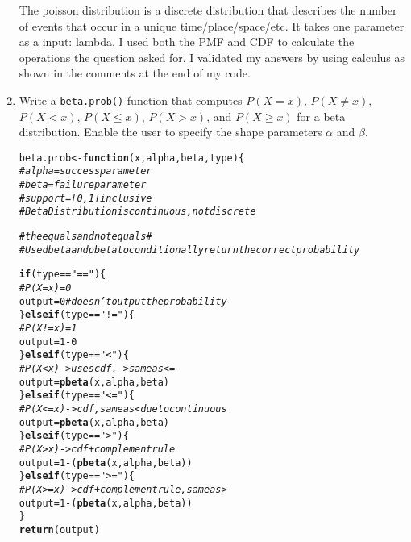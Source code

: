 \documentclass{article}\usepackage[]{graphicx}\usepackage[]{xcolor}
\makeatletter
\newcommand{\hlnum}[1]{\textcolor[rgb]{0.686,0.059,0.569}{#1}}%
\newcommand{\hlsng}[1]{\textcolor[rgb]{0.192,0.494,0.8}{#1}}%
\newcommand{\hlcom}[1]{\textcolor[rgb]{0.678,0.584,0.686}{\textit{#1}}}%
\newcommand{\hlopt}[1]{\textcolor[rgb]{0,0,0}{#1}}%
\newcommand{\hldef}[1]{\textcolor[rgb]{0.345,0.345,0.345}{#1}}%
\newcommand{\hlkwa}[1]{\textcolor[rgb]{0.161,0.373,0.58}{\textbf{#1}}}%
\newcommand{\hlkwb}[1]{\textcolor[rgb]{0.69,0.353,0.396}{#1}}%
\newcommand{\hlkwc}[1]{\textcolor[rgb]{0.333,0.667,0.333}{#1}}%
\newcommand{\hlkwd}[1]{\textcolor[rgb]{0.737,0.353,0.396}{\textbf{#1}}}%
\newenvironment{kframe}{%
 \def\at@end@of@kframe{}%
 \ifinner\ifhmode%
  \def\at@end@of@kframe{\end{minipage}}%
  \begin{minipage}{\columnwidth}%
 \fi\fi%
 \def\FrameCommand##1{\hskip\@totalleftmargin \hskip-\fboxsep
 \colorbox{shadecolor}{##1}\hskip-\fboxsep
     \hskip-\linewidth \hskip-\@totalleftmargin \hskip\columnwidth}%
 \MakeFramed {\advance\hsize-\width
   \@totalleftmargin\z@ \linewidth\hsize
   \@setminipage}}%
 {\par\unskip\endMakeFramed%
 \at@end@of@kframe}
\newenvironment{knitrout}{}{} %
\makeatother
\begin{document}
\begin{enumerate}
The poisson distribution is a discrete distribution that describes the number of events that occur in a unique time/place/space/etc. It takes one parameter as a input: lambda. I used both the PMF and CDF to calculate the operations the question asked for. I validated my answers by using calculus as shown in the comments at the end of my code. 

    \item Write a \texttt{beta.prob()} function that computes $P(X=x)$, 
    $P(X \neq x)$, $P(X<x)$, $P(X \leq x)$, $P(X > x)$, and $P(X \geq x)$
    for a beta distribution. Enable the user to specify the shape parameters
    $\alpha$ and $\beta$.
\begin{knitrout}\scriptsize
{}\color{fgcolor}\begin{kframe}
\begin{alltt}
\hldef{beta.prob} \hlkwb{<-} \hlkwa{function}\hldef{(}\hlkwc{x}\hldef{,} \hlkwc{alpha}\hldef{,} \hlkwc{beta}\hldef{,} \hlkwc{type}\hldef{)\{}
  \hlcom{# alpha = success parameter}
  \hlcom{# beta = failure parameter}
  \hlcom{# support = [0,1] inclusive}
  \hlcom{# Beta Distribution is continuous, not discrete}

  \hlcom{# the equals and not equals # }
  \hlcom{# Use dbeta and pbeta to conditionally return the correct probability}

  \hlkwa{if} \hldef{(type} \hlopt{==} \hlsng{"=="}\hldef{)\{}
    \hlcom{# P(X = x) = 0}
    \hldef{output} \hlkwb{=} \hlnum{0} \hlcom{# doesn't output the probability}
  \hldef{\}}\hlkwa{else if} \hldef{(type} \hlopt{==} \hlsng{"!="}\hldef{)\{}
    \hlcom{# P(X != x) = 1}
    \hldef{output} \hlkwb{=} \hlnum{1} \hlopt{-} \hlnum{0}
  \hldef{\}}\hlkwa{else if} \hldef{(type} \hlopt{==} \hlsng{"<"}\hldef{)\{}
    \hlcom{# P(X < x) -> uses cdf.      -> same as <=}
    \hldef{output} \hlkwb{=} \hlkwd{pbeta}\hldef{(x, alpha, beta)}
  \hldef{\}}\hlkwa{else if} \hldef{(type} \hlopt{==} \hlsng{"<="}\hldef{)\{}
    \hlcom{# P(X <= x) -> cdf , same as < due to continuous}
    \hldef{output} \hlkwb{=} \hlkwd{pbeta}\hldef{(x, alpha, beta)}
  \hldef{\}}\hlkwa{else if} \hldef{(type} \hlopt{==} \hlsng{">"}\hldef{)\{}
    \hlcom{# P(X > x) -> cdf + complement rule}
    \hldef{output} \hlkwb{=} \hlnum{1} \hlopt{-} \hldef{(}\hlkwd{pbeta}\hldef{(x, alpha, beta))}
  \hldef{\}}\hlkwa{else if} \hldef{(type} \hlopt{==} \hlsng{">="}\hldef{)\{}
    \hlcom{# P(X >= x) -> cdf + complement rule, same as >}
    \hldef{output} \hlkwb{=} \hlnum{1} \hlopt{-} \hldef{(}\hlkwd{pbeta}\hldef{(x, alpha, beta))}
  \hldef{\}}
  \hlkwd{return}\hldef{(output)}


\end{alltt}
\end{kframe}
\end{knitrout}
\end{enumerate}
\end{document}
